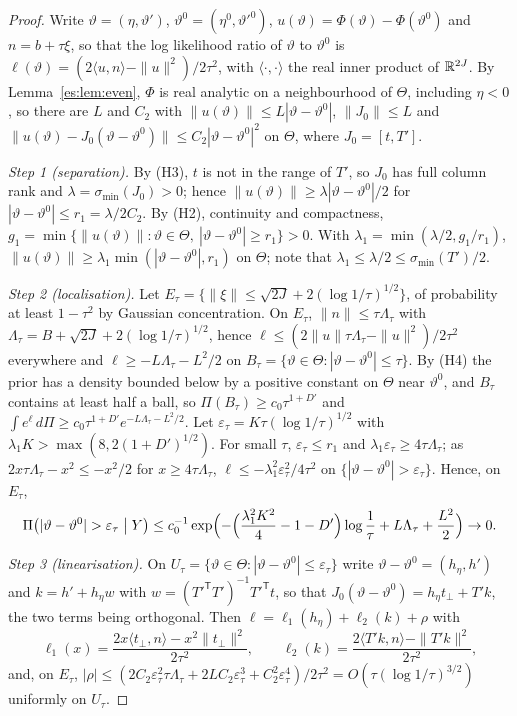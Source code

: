 \begin{proof}
Write $\vartheta=(\eta,\vartheta')$, $\vartheta^0=(\eta^0,\vartheta'^0)$, $u(\vartheta)=\Phi(\vartheta)-\Phi(\vartheta^0)$ and $n=b+\tau\xi$, so that the log likelihood ratio of $\vartheta$ to $\vartheta^0$ is $\ell(\vartheta)=(2\langle u,n\rangle-\|u\|^2)/2\tau^2$, with $\langle\cdot,\cdot\rangle$ the real inner product of $\mathbb{R}^{2J}$. By Lemma~\ref{es:lem:even}, $\Phi$ is real analytic on a neighbourhood of $\Theta$, including $\eta<0$, so there are $L$ and $C_2$ with $\|u(\vartheta)\|\le L|\vartheta-\vartheta^0|$, $\|J_0\|\le L$ and $\|u(\vartheta)-J_0(\vartheta-\vartheta^0)\|\le C_2|\vartheta-\vartheta^0|^2$ on $\Theta$, where $J_0=[t,T']$.

\emph{Step 1 (separation).} By (H3), $t$ is not in the range of $T'$, so $J_0$ has full column rank and $\lambda=\sigma_{\min}(J_0)>0$; hence $\|u(\vartheta)\|\ge\lambda|\vartheta-\vartheta^0|/2$ for $|\vartheta-\vartheta^0|\le r_1=\lambda/2C_2$. By (H2), continuity and compactness, $g_1=\min\{\|u(\vartheta)\|:\vartheta\in\Theta,\ |\vartheta-\vartheta^0|\ge r_1\}>0$. With $\lambda_1=\min(\lambda/2,g_1/r_1)$, $\|u(\vartheta)\|\ge\lambda_1\min(|\vartheta-\vartheta^0|,r_1)$ on $\Theta$; note that $\lambda_1\le\lambda/2\le\sigma_{\min}(T')/2$.

\emph{Step 2 (localisation).} Let $E_\tau=\{\|\xi\|\le\sqrt{2J}+2(\log1/\tau)^{1/2}\}$, of probability at least $1-\tau^2$ by Gaussian concentration. On $E_\tau$, $\|n\|\le\tau\Lambda_\tau$ with $\Lambda_\tau=B+\sqrt{2J}+2(\log1/\tau)^{1/2}$, hence $\ell\le(2\|u\|\tau\Lambda_\tau-\|u\|^2)/2\tau^2$ everywhere and $\ell\ge-L\Lambda_\tau-L^2/2$ on $B_\tau=\{\vartheta\in\Theta:|\vartheta-\vartheta^0|\le\tau\}$. By (H4) the prior has a density bounded below by a positive constant on $\Theta$ near $\vartheta^0$, and $B_\tau$ contains at least half a ball, so $\Pi(B_\tau)\ge c_0\tau^{1+D'}$ and $\int e^\ell\,d\Pi\ge c_0\tau^{1+D'}e^{-L\Lambda_\tau-L^2/2}$. Let $\varepsilon_\tau=K\tau(\log1/\tau)^{1/2}$ with $\lambda_1K>\max(8,2(1+D')^{1/2})$. For small $\tau$, $\varepsilon_\tau\le r_1$ and $\lambda_1\varepsilon_\tau\ge4\tau\Lambda_\tau$; as $2x\tau\Lambda_\tau-x^2\le-x^2/2$ for $x\ge4\tau\Lambda_\tau$, $\ell\le-\lambda_1^2\varepsilon_\tau^2/4\tau^2$ on $\{|\vartheta-\vartheta^0|>\varepsilon_\tau\}$. Hence, on $E_\tau$,
\[
\Pi\bigl(|\vartheta-\vartheta^0|>\varepsilon_\tau\bigm|Y\bigr)\le c_0^{-1}\exp\Bigl(-\Bigl(\frac{\lambda_1^2K^2}4-1-D'\Bigr)\log\frac1\tau+L\Lambda_\tau+\frac{L^2}2\Bigr)\to0 .
\]

\emph{Step 3 (linearisation).} On $U_\tau=\{\vartheta\in\Theta:|\vartheta-\vartheta^0|\le\varepsilon_\tau\}$ write $\vartheta-\vartheta^0=(h_\eta,h')$ and $k=h'+h_\eta w$ with $w=(T'^{\mathsf T}T')^{-1}T'^{\mathsf T}t$, so that $J_0(\vartheta-\vartheta^0)=h_\eta t_\perp+T'k$, the two terms being orthogonal. Then $\ell=\ell_1(h_\eta)+\ell_2(k)+\rho$ with
\[
\ell_1(x)=\frac{2x\langle t_\perp,n\rangle-x^2\|t_\perp\|^2}{2\tau^2},\qquad\ell_2(k)=\frac{2\langle T'k,n\rangle-\|T'k\|^2}{2\tau^2},
\]
and, on $E_\tau$, $|\rho|\le(2C_2\varepsilon_\tau^2\tau\Lambda_\tau+2LC_2\varepsilon_\tau^3+C_2^2\varepsilon_\tau^4)/2\tau^2=O(\tau(\log1/\tau)^{3/2})$ uniformly on $U_\tau$.


\end{proof}
